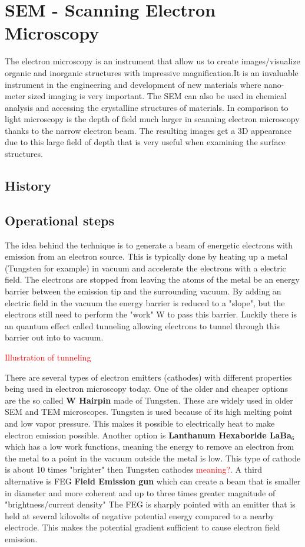 \section{SEM - Scanning Electron Microscopy}
The electron microscopy is an instrument that allow us to create images/visualize organic and inorganic structures with impressive magnification.It is an invaluable instrument in the engineering and development of new materials where nano-meter sized imaging is very important. The SEM can also be used in chemical analysis and accessing the crystalline structures of materials. In comparison to light microscopy is the depth of field much larger in scanning electron microscopy thanks to the narrow electron beam. The resulting images get a 3D appearance due to this large field of depth that is very useful when examining the surface structures. 

\subsection{History}

\subsection{Operational steps}
The idea behind the technique is to generate a beam of energetic electrons with emission from an electron source. This is typically done by heating up a metal (Tungsten for example) in vacuum and accelerate the electrons with a electric field. The electrons are stopped from leaving the atoms of the metal be an energy barrier between the emission tip and the surrounding vacuum. By adding an electric field in the vacuum the energy barrier is reduced to a "slope", but the electrons still need to perform the "work" W to pass this barrier. Luckily there is an quantum effect called tunneling allowing electrons to tunnel through this barrier out into to vacuum.   

\textcolor{red}{Illustration of tunneling} 

There are several types of electron emitters (cathodes) with different properties being used in electron microscopy today. One of the older and cheaper options are the so called \textbf{W Hairpin} made of Tungsten. These are widely used in older SEM and TEM microscopes. Tungsten is used because of its high melting point and low vapor pressure. This makes it possible to electrically heat to make electron emission possible. Another option is \textbf{Lanthanum Hexaboride LaBa$_6$} which has a low work functions, meaning the energy to remove an electron from the metal to a point in the vacuum outside the metal is low. This type of cathode is about 10 times "brighter" then Tungsten cathodes \textcolor{red}{meaning?}. A third alternative is FEG \textbf{Field Emission gun} which can create a beam that is smaller in diameter and more coherent and up to three times greater magnitude of "brightness/current density" The FEG is sharply pointed with an emitter that is held at several kilovolts of negative potential energy compared to a nearby electrode. This makes the potential gradient sufficient to cause electron field emission.     



